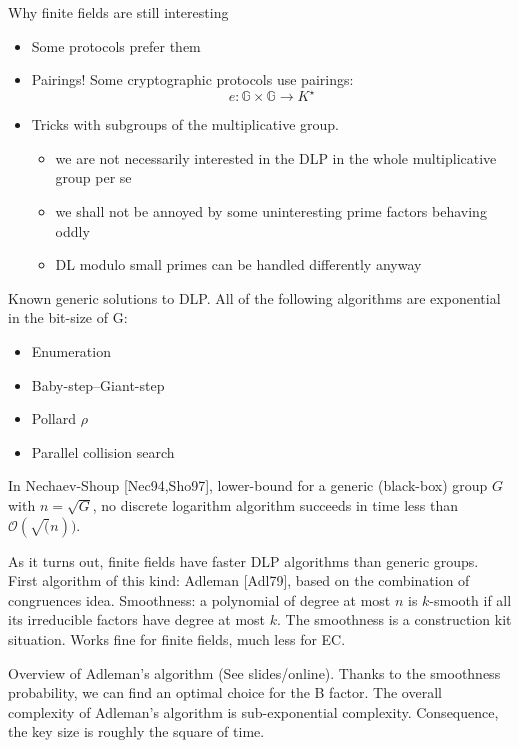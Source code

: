 \documentclass[11pt]{article}
\begin{document}
Why finite fields are still interesting 
\begin{itemize}
	\item Some protocols prefer them
	\item Pairings! Some cryptographic protocols use pairings:
\[
	e: \mathbb{G} \times \mathbb{G} \to K^\star
\]
	\item Tricks with subgroups of the multiplicative group. \begin{itemize}
		\item we are not necessarily interested in the DLP in the whole
multiplicative group per se
		\item we shall not be annoyed by some uninteresting prime factors
behaving oddly
		\item DL modulo small primes can be handled differently anyway 
	\end{itemize}
\end{itemize}

Known generic solutions to DLP. All of the following algorithms are exponential in the bit-size of G:
\begin{itemize}
	\item Enumeration
	\item Baby-step–Giant-step
	\item Pollard $\rho$
	\item Parallel collision search
\end{itemize}

In Nechaev-Shoup [Nec94,Sho97], lower-bound for a generic (black-box) group $G$ with $n = \sqrt{G}$, no discrete logarithm algorithm succeeds in time less than $\mathcal{O}(\sqrt(n))$.

As it turns out, finite fields have faster DLP algorithms than generic groups. First algorithm of this kind: Adleman [Adl79], based on the combination of congruences idea. \newline
Smoothness: a polynomial of degree at most $n$ is $k$-smooth if all its irreducible factors have degree at most $k$. The smoothness is a construction kit situation. Works fine for finite fields, much less for EC. 

Overview of Adleman's algorithm (See slides/online). Thanks to the smoothness probability, we can find an optimal choice for the B factor. The overall complexity of Adleman's algorithm is sub-exponential complexity. Consequence, the key size is roughly the square of time. 
\end{document}
